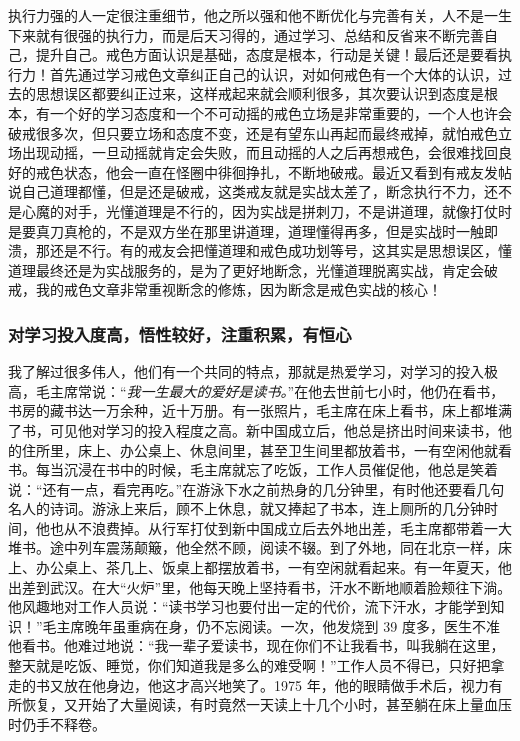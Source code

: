 执行力强的人一定很注重细节，他之所以强和他不断优化与完善有关，人不是一生下来就有很强的执行力，而是后天习得的，通过学习、总结和反省来不断完善自己，提升自己。戒色方面认识是基础，态度是根本，行动是关键！最后还是要看执行力！首先通过学习戒色文章纠正自己的认识，对如何戒色有一个大体的认识，过去的思想误区都要纠正过来，这样戒起来就会顺利很多，其次要认识到态度是根本，有一个好的学习态度和一个不可动摇的戒色立场是非常重要的，一个人也许会破戒很多次，但只要立场和态度不变，还是有望东山再起而最终戒掉，就怕戒色立场出现动摇，一旦动摇就肯定会失败，而且动摇的人之后再想戒色，会很难找回良好的戒色状态，他会一直在怪圈中徘徊挣扎，不断地破戒。最近又看到有戒友发帖说自己道理都懂，但是还是破戒，这类戒友就是实战太差了，断念执行不力，还不是心魔的对手，光懂道理是不行的，因为实战是拼刺刀，不是讲道理，就像打仗时是要真刀真枪的，不是双方坐在那里讲道理，道理懂得再多，但是实战时一触即溃，那还是不行。有的戒友会把懂道理和戒色成功划等号，这其实是思想误区，懂道理最终还是为实战服务的，是为了更好地断念，光懂道理脱离实战，肯定会破戒，我的戒色文章非常重视断念的修炼，因为断念是戒色实战的核心！

\subsubsection{对学习投入度高，悟性较好，注重积累，有恒心}

我了解过很多伟人，他们有一个共同的特点，那就是热爱学习，对学习的投入极高，毛主席常说：“\textit{我一生最大的爱好是读书。}”在他去世前七小时，他仍在看书，书房的藏书达一万余种，近十万册。有一张照片，毛主席在床上看书，床上都堆满了书，可见他对学习的投入程度之高。新中国成立后，他总是挤出时间来读书，他的住所里，床上、办公桌上、休息间里，甚至卫生间里都放着书，一有空闲他就看书。每当沉浸在书中的时候，毛主席就忘了吃饭，工作人员催促他，他总是笑着说：“还有一点，看完再吃。”在游泳下水之前热身的几分钟里，有时他还要看几句名人的诗词。游泳上来后，顾不上休息，就又捧起了书本，连上厕所的几分钟时间，他也从不浪费掉。从行军打仗到新中国成立后去外地出差，毛主席都带着一大堆书。途中列车震荡颠簸，他全然不顾，阅读不辍。到了外地，同在北京一样，床上、办公桌上、茶几上、饭桌上都摆放着书，一有空闲就看起来。有一年夏天，他出差到武汉。在大“火炉”里，他每天晚上坚持看书，汗水不断地顺着脸颊往下淌。他风趣地对工作人员说：“读书学习也要付出一定的代价，流下汗水，才能学到知识！”毛主席晚年虽重病在身，仍不忘阅读。一次，他发烧到 39 度多，医生不准他看书。他难过地说：“我一辈子爱读书，现在你们不让我看书，叫我躺在这里，整天就是吃饭、睡觉，你们知道我是多么的难受啊！”工作人员不得已，只好把拿走的书又放在他身边，他这才高兴地笑了。1975 年，他的眼睛做手术后，视力有所恢复，又开始了大量阅读，有时竟然一天读上十几个小时，甚至躺在床上量血压时仍手不释卷。

